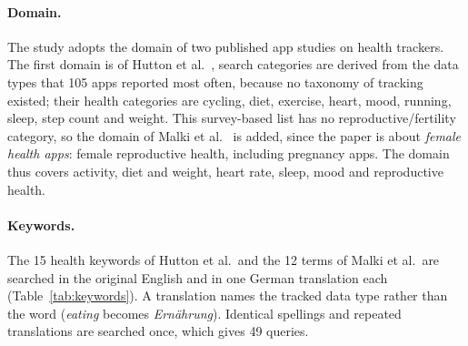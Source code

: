 \paragraph{Domain.} The study adopts the domain of two published app studies
on health trackers. The first domain is of Hutton et
al.~\parencite{hutton2018assessing}, search categories are derived from the
data types that 105 apps reported most often, because no taxonomy of tracking existed; their health categories are cycling, diet,
exercise, heart, mood, running, sleep, step count and weight. This
survey-based list has no reproductive/fertility category, so the domain of Malki et
al.~\parencite{malki2024exploring} is added, since the paper is about \emph{female health apps}: female reproductive health,
including pregnancy apps. The domain thus covers activity, diet and weight,
heart rate, sleep, mood and reproductive health.

\paragraph{Keywords.} The 15 health keywords of Hutton et al.\ and the 12
terms of Malki et al.\ are searched in the original English and in one German
translation each (Table~\ref{tab:keywords}). A translation names the tracked
data type rather than the word (\emph{eating} becomes \emph{Ernährung}).
Identical spellings and repeated translations are searched once, which gives
49 queries.

